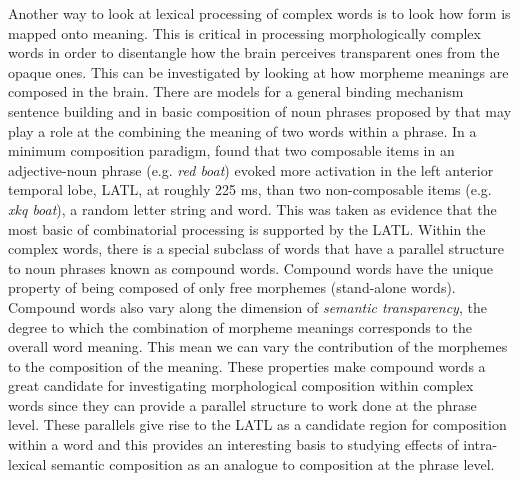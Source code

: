 \documentclass{frontiersSCNS}
\begin{document}
	Another way to look at lexical processing of complex words is to look how form is mapped onto meaning. This is critical in processing morphologically complex words in order to disentangle how the brain perceives transparent ones from the opaque ones. This can be investigated by looking at how morpheme meanings are composed in the brain. There are models for a general binding mechanism sentence building \citep*{Friederici:2000} and in basic composition of noun phrases proposed by \citet*{Bemis:2011} that may play a role at the combining the meaning of two words within a phrase. In a minimum composition paradigm, \citep{Bemis:2011} found that two composable items in an adjective-noun phrase (e.g. \textit{red boat}) evoked more activation in the left anterior temporal lobe, LATL, at roughly 225 ms, than two non-composable items (e.g. \textit{xkq boat}), a random letter string and word. This was taken as evidence that the most basic of combinatorial processing is supported by the LATL. Within the complex words, there is a special subclass of words that have a parallel structure to noun phrases known as compound words. Compound words have the unique property of being composed of only free morphemes (stand-alone words). Compound words also vary along the dimension of \textit{semantic transparency}, the degree to which the combination of morpheme meanings corresponds to the overall word meaning. This mean we can vary the contribution of the morphemes to the composition of the meaning. These properties make compound words a great candidate for investigating morphological composition within complex words since they can provide a parallel structure to work done at the phrase level. These parallels give rise to the LATL as a candidate region for composition within a word and this provides an interesting basis to studying effects of intra-lexical semantic composition as an analogue to composition at the phrase level.
\end{document}
